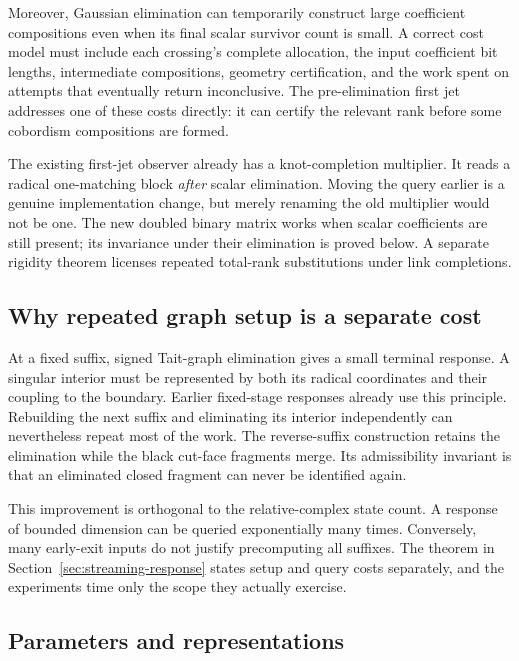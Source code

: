 Moreover, Gaussian elimination can temporarily construct large coefficient
compositions even when its final scalar survivor count is small. A correct
cost model must include each crossing's complete allocation, the input
coefficient bit lengths, intermediate compositions, geometry certification,
and the work spent on attempts that eventually return inconclusive. The
pre-elimination first jet addresses one of these costs directly: it can
certify the relevant rank before some cobordism compositions are formed.

The existing first-jet observer already has a knot-completion multiplier.
It reads a radical one-matching block \emph{after} scalar elimination.
Moving the query earlier is a genuine implementation change, but merely
renaming the old multiplier would not be one. The new doubled binary matrix
works when scalar coefficients are still present; its invariance under
their elimination is proved below. A separate rigidity theorem licenses
repeated total-rank substitutions under link completions.

\subsection{Why repeated graph setup is a separate cost}

At a fixed suffix, signed Tait-graph elimination gives a small terminal
response. A singular interior must be represented by both its radical
coordinates and their coupling to the boundary. Earlier fixed-stage
responses already use this principle. Rebuilding the next suffix and
eliminating its interior independently can nevertheless repeat most of
the work. The reverse-suffix construction retains the elimination while
the black cut-face fragments merge. Its admissibility invariant is that
an eliminated closed fragment can never be identified again.

This improvement is orthogonal to the relative-complex state count. A
response of bounded dimension can be queried exponentially many times.
Conversely, many early-exit inputs do not justify precomputing all suffixes.
The theorem in Section~\ref{sec:streaming-response} states setup and query
costs separately, and the experiments time only the scope they actually
exercise.

\subsection{Parameters and representations}

